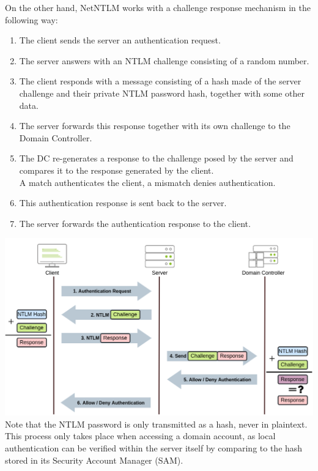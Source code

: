 {On the other hand, NetNTLM works with a challenge response mechanism in the following way:\\
\begin{enumerate}
\item The client sends the server an authentication request.
\item The server answers with an NTLM challenge consisting of a random number.
\item The client responds with a message consisting of a hash made of the server challenge and their private NTLM password hash, together with some other data.
\item The server forwards this response together with its own challenge to the Domain Controller. 
\item The DC re-generates a response to the challenge posed by the server and compares it to the response generated by the client. \\
A match authenticates the client, a mismatch denies authentication.
\item This authentication response is sent back to the server.
\item The server forwards the authentication response to the client. 
\end{enumerate}
\includegraphics[scale=0.35]{Complete_Beginner_Path/Windows_Exploitation_Basics_Room/AD_Authentication_4.png}\\
Note that the NTLM password is only transmitted as a hash, never in plaintext.\\
This process only takes place when accessing a domain account, as local authentication can be verified within the server itself by comparing to the hash stored in its Security Account Manager (SAM).\\

}

